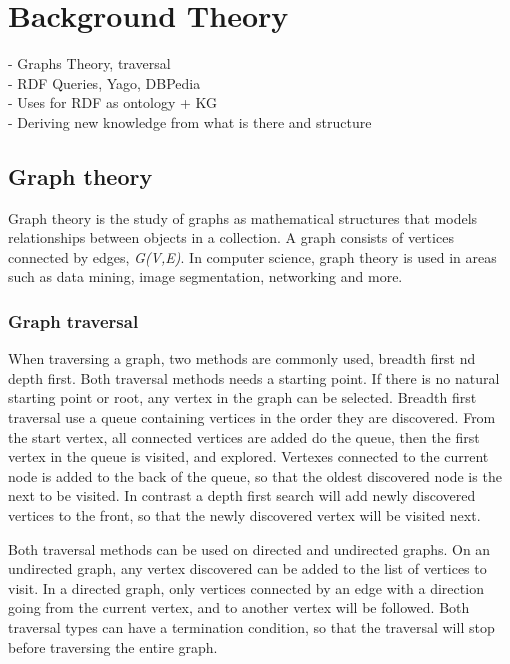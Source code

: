 \chapter{Background Theory}
\label{cha:background_theory}
- Graphs Theory, traversal\\
- RDF Queries, Yago, DBPedia\\
- Uses for RDF as ontology + KG\\
    - Deriving new knowledge from what is there and structure\\

\section{Graph theory}
Graph theory is the study of graphs as mathematical structures that models relationships between objects in a collection. A graph consists of vertices connected by edges, \emph{G(V,E)}. In computer science, graph theory is used in areas such as data mining, image segmentation, networking and more\cite{riaz2011applications}. 

\subsection{Graph traversal}
When traversing a graph, two methods are commonly used, breadth first nd depth first. Both traversal methods needs a starting point. If there is no natural starting point or root, any vertex in the graph can be selected. Breadth first traversal use a queue containing vertices in the order they are discovered. From the start vertex, all connected vertices are added do the queue, then the first vertex in the queue is visited, and explored. Vertexes connected to the current node is added to the back of the queue, so that the oldest discovered node is the next to be visited. In contrast a depth first search will add newly discovered vertices to the front, so that the newly discovered vertex will be visited next.

Both traversal methods can be used on directed and undirected graphs. On an undirected graph, any vertex discovered can be added to the list of vertices to visit. In a directed graph, only vertices connected by an edge with a direction going from the current vertex, and to another vertex will be followed. Both traversal types can have a termination condition, so that the traversal will stop before traversing the entire graph. 

